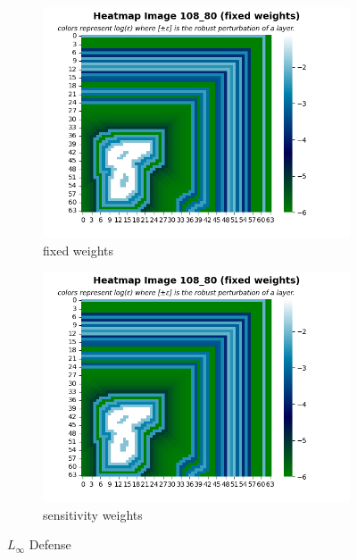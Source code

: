     \begin{figure}
         \centering
         \begin{subfigure}[b]{0.4\textwidth}
             \centering
             \includegraphics[width=\textwidth]{lInf_defense_fixed_weights.png}
             \caption{fixed weights}
             \label{sub-fig:LInf defense FW}
         \end{subfigure}
         \hfill
         \begin{subfigure}[b]{0.4\textwidth}
             \centering
             \includegraphics[width=\textwidth]{lInf_defense_sensitivity_weights.png}
             \caption{sensitivity weights}
             \label{sub-fig:LInf defense SW}
         \end{subfigure}
         \caption{$L_{\infty}$ Defense}
         \label{fig:LInf defense}
    \end{figure}

